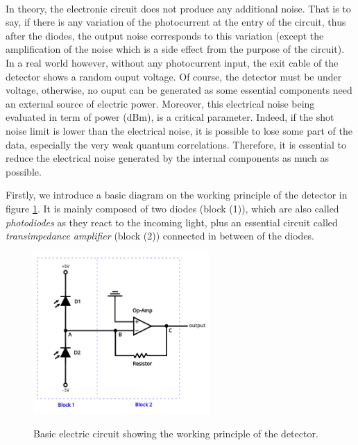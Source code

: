 \documentclass[10pt]{report}
\begin{document}
\paragraph{}

In theory, the electronic circuit does not produce any additional noise. That is to say, if there is any variation of the photocurrent at the entry of the circuit, thus after the diodes, the output noise corresponds to this variation (except the amplification of the noise which is a side effect from the purpose of the circuit). In a real world however, without any photocurrent input, the exit cable of the detector shows a random ouput voltage. Of course, the detector must be under voltage, otherwise, no ouput can be generated as some essential components need an external source of electric power. Moreover, this electrical noise being evaluated in term of power (dBm), is a critical parameter. Indeed, if the shot noise limit is lower than the electrical noise, it is possible to lose some part of the data, especially the very weak quantum correlations. Therefore, it is essential to reduce the electrical noise generated by the internal components as much as possible.

Firstly, we introduce a basic diagram on the working principle of the detector in figure \ref{fig:detector-fst}. It is mainly composed of two diodes (block (1)), which are also called \textit{photodiodes} as they react to the incoming light, plus an essential circuit called \textit{transimpedance amplifier} (block (2)) connected in between of the diodes.

\begin{figure}[h!]
\caption{Basic electric circuit showing the working principle of the detector.}
\centering
\includegraphics[width=0.6\textwidth]{detector-fst}
\label{fig:detector-fst}
\end{figure}
\end{document}

